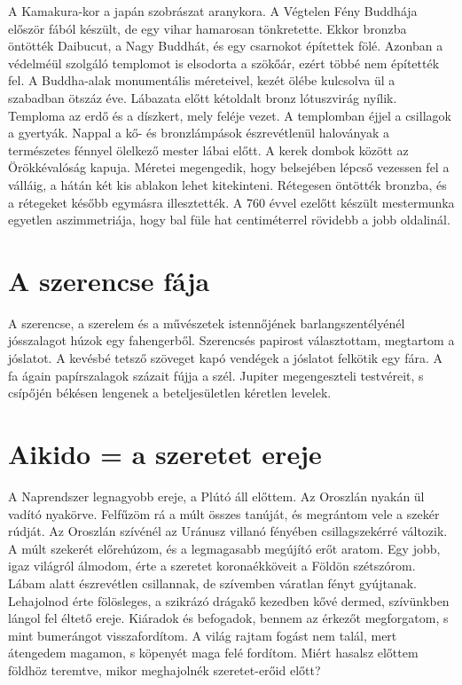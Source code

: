 A Kamakura-kor a japán szobrászat aranykora. A Végtelen Fény
Buddhája először fából készült, de egy vihar hamarosan tönkretette.
Ekkor bronzba öntötték Daibucut, a Nagy Buddhát, és egy csarnokot
építettek fölé. Azonban a védelméül szolgáló templomot is elsodorta a
szökőár, ezért többé nem építették fel. A Buddha-alak monumentális
méreteivel, kezét ölébe kulcsolva ül a szabadban ötszáz éve. Lábazata
előtt kétoldalt bronz lótuszvirág nyílik. Temploma az erdő és a díszkert,
mely feléje vezet. A templomban éjjel a csillagok a gyertyák. Nappal
a kő- és bronzlámpások észrevétlenül haloványak a természetes
fénnyel ölelkező mester lábai előtt. A kerek dombok között az Örökkévalóság
kapuja. Méretei megengedik, hogy belsejében lépcső vezessen
fel a válláig, a hátán két kis ablakon lehet kitekinteni. Rétegesen
öntötték bronzba, és a rétegeket később egymásra illesztették. A 760
évvel ezelőtt készült mestermunka egyetlen aszimmetriája, hogy bal
füle hat centiméterrel rövidebb a jobb oldalinál.


\section{A szerencse fája}

A szerencse, a szerelem és a művészetek istennőjének barlangszentélyénél
jósszalagot húzok egy fahengerből. Szerencsés papirost választottam,
megtartom a jóslatot. A kevésbé tetsző szöveget kapó vendégek
a jóslatot felkötik egy fára. A fa ágain papírszalagok százait fújja
a szél. Jupiter megengeszteli testvéreit, s csípőjén békésen lengenek a
beteljesületlen kéretlen levelek.

\section{Aikido = a szeretet ereje}

\begin{itshape}
A Naprendszer legnagyobb ereje, a Plútó áll előttem. Az Oroszlán nyakán
ül vadító nyakörve. Felfűzöm rá a múlt összes tanúját, és megrántom
vele a szekér rúdját. Az Oroszlán szívénél az Uránusz villanó fényében
csillagszekérré változik. A múlt szekerét előrehúzom, és a legmagasabb
megújító erőt aratom. Egy jobb, igaz világról álmodom, érte a szeretet
koronaékköveit a Földön szétszórom. Lábam alatt észrevétlen csillannak, de
szívemben váratlan fényt gyújtanak. Lehajolnod érte fölösleges, a szikrázó
drágakő kezedben kővé dermed, szívünkben lángol fel éltető ereje.
Kiáradok és befogadok, bennem az érkezőt megforgatom, s mint bumerángot
visszafordítom. A világ rajtam fogást nem talál, mert átengedem magamon,
s köpenyét maga felé fordítom. Miért hasalsz előttem földhöz teremtve,
mikor meghajolnék szeretet-erőid előtt?
\end{itshape}

